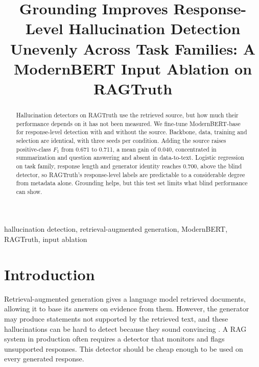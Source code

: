 \documentclass[conference]{IEEEtran}
\begin{document}
\title{Grounding Improves Response-Level Hallucination Detection Unevenly Across Task Families: A ModernBERT Input Ablation on RAGTruth}

\author{
}

\maketitle

\begin{abstract}
Hallucination detectors on RAGTruth use the retrieved source, but how much
their performance depends on it has not been measured. We fine-tune
ModernBERT-base for response-level detection with and without the source.
Backbone, data, training and selection are identical, with three seeds per
condition. Adding the source raises positive-class $F_1$ from 0.671 to 0.711,
a mean gain of 0.040, concentrated in summarization and question answering and
absent in data-to-text. Logistic regression on task family, response length and
generator identity reaches 0.700, above the blind detector, so RAGTruth's
response-level labels are predictable to a considerable degree from metadata
alone. Grounding
helps, but this test set limits what blind performance can show.
\end{abstract}

\begin{IEEEkeywords}
hallucination detection, retrieval-augmented generation, ModernBERT, RAGTruth, input ablation
\end{IEEEkeywords}

\section{Introduction}

Retrieval-augmented generation gives a language model retrieved documents, 
allowing it to base its answers on evidence from them\cite{lewis2020rag}. 
However, the generator may produce statements not supported by the retrieved text, 
and these hallucinations can be hard to detect because they sound convincing \cite{ji2023survey}.
A RAG system in production often requires a detector that monitors and
flags unsupported responses. This detector should be cheap enough to
be used on every generated response.
\end{document}
